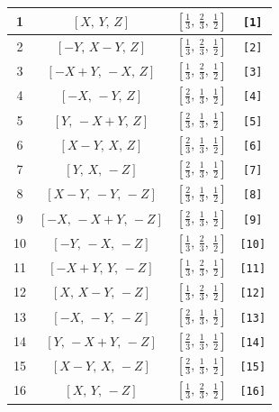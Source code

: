 \documentclass[fleqn,8pt]{jsarticle}
\begin{document}
\begin{longtable}{cccc}
1 & $\left[ X,\, Y,\, Z \right]$ & $\left[ \frac{1}{3},\, \frac{2}{3},\, \frac{1}{2} \right]$ & {\tt [1]} \\ \hline
2 & $\left[ - Y,\, X - Y,\, Z \right]$ & $\left[ \frac{1}{3},\, \frac{2}{3},\, \frac{1}{2} \right]$ & {\tt [2]} \\ \hline
3 & $\left[ - X + Y,\, - X,\, Z \right]$ & $\left[ \frac{1}{3},\, \frac{2}{3},\, \frac{1}{2} \right]$ & {\tt [3]} \\ \hline
4 & $\left[ - X,\, - Y,\, Z \right]$ & $\left[ \frac{2}{3},\, \frac{1}{3},\, \frac{1}{2} \right]$ & {\tt [4]} \\ \hline
5 & $\left[ Y,\, - X + Y,\, Z \right]$ & $\left[ \frac{2}{3},\, \frac{1}{3},\, \frac{1}{2} \right]$ & {\tt [5]} \\ \hline
6 & $\left[ X - Y,\, X,\, Z \right]$ & $\left[ \frac{2}{3},\, \frac{1}{3},\, \frac{1}{2} \right]$ & {\tt [6]} \\ \hline
7 & $\left[ Y,\, X,\, - Z \right]$ & $\left[ \frac{2}{3},\, \frac{1}{3},\, \frac{1}{2} \right]$ & {\tt [7]} \\ \hline
8 & $\left[ X - Y,\, - Y,\, - Z \right]$ & $\left[ \frac{2}{3},\, \frac{1}{3},\, \frac{1}{2} \right]$ & {\tt [8]} \\ \hline
9 & $\left[ - X,\, - X + Y,\, - Z \right]$ & $\left[ \frac{2}{3},\, \frac{1}{3},\, \frac{1}{2} \right]$ & {\tt [9]} \\ \hline
10 & $\left[ - Y,\, - X,\, - Z \right]$ & $\left[ \frac{1}{3},\, \frac{2}{3},\, \frac{1}{2} \right]$ & {\tt [10]} \\ \hline
11 & $\left[ - X + Y,\, Y,\, - Z \right]$ & $\left[ \frac{1}{3},\, \frac{2}{3},\, \frac{1}{2} \right]$ & {\tt [11]} \\ \hline
12 & $\left[ X,\, X - Y,\, - Z \right]$ & $\left[ \frac{1}{3},\, \frac{2}{3},\, \frac{1}{2} \right]$ & {\tt [12]} \\ \hline
13 & $\left[ - X,\, - Y,\, - Z \right]$ & $\left[ \frac{2}{3},\, \frac{1}{3},\, \frac{1}{2} \right]$ & {\tt [13]} \\ \hline
14 & $\left[ Y,\, - X + Y,\, - Z \right]$ & $\left[ \frac{2}{3},\, \frac{1}{3},\, \frac{1}{2} \right]$ & {\tt [14]} \\ \hline
15 & $\left[ X - Y,\, X,\, - Z \right]$ & $\left[ \frac{2}{3},\, \frac{1}{3},\, \frac{1}{2} \right]$ & {\tt [15]} \\ \hline
16 & $\left[ X,\, Y,\, - Z \right]$ & $\left[ \frac{1}{3},\, \frac{2}{3},\, \frac{1}{2} \right]$ & {\tt [16]} \\ \hline

\end{longtable}
\end{document}
